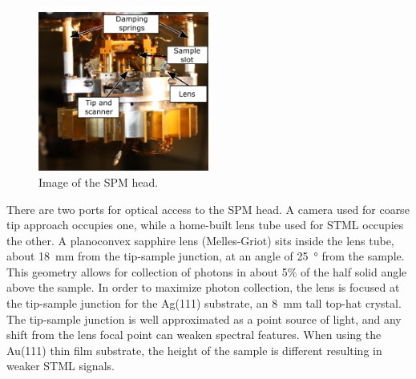 \begin{figure} [h]
    \centering
    \includegraphics[width=0.5\textwidth]{pictures/spm_head_labelled.png}
    \caption{Image of the SPM head.}
    \label{fig:expsetup:head}
\end{figure}

There are two ports for optical access to the \ac{SPM} head. A camera used for coarse tip approach occupies one, while a home-built lens tube used for \ac{STML} occupies the other. A planoconvex sapphire lens (Melles-Griot) sits inside the lens tube, about \SI{18}{mm} from the tip-sample junction, at an angle of \SI{25}{\degree} from the sample. This geometry allows for collection of photons in about 5\% of the half solid angle above the sample. In order to maximize photon collection, the lens is focused at the tip-sample junction for the Ag(111) substrate, an \SI{8}{mm} tall top-hat crystal. The tip-sample junction is well approximated as a point source of light, and any shift from the lens focal point can weaken spectral features. When using the Au(111) thin film substrate, the height of the sample is different resulting in weaker \ac{STML} signals.

